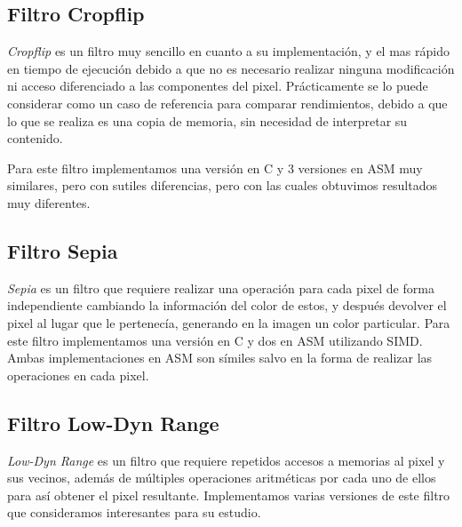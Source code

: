 \subsection{Filtro Cropflip}

\textit{Cropflip} es un filtro muy sencillo en cuanto a su implementación, y el mas rápido en tiempo de ejecución debido a que no es necesario realizar ninguna modificación ni acceso diferenciado a las componentes del pixel.
Prácticamente se lo puede considerar como un caso de referencia para comparar rendimientos, debido a que lo que se realiza es una copia de memoria, sin necesidad de interpretar su contenido.

Para este filtro implementamos una versión en C y 3 versiones en ASM muy similares, pero con sutiles diferencias, pero con las cuales obtuvimos resultados muy diferentes.




\subsection{Filtro Sepia}
\textit{Sepia} es un filtro que requiere realizar una operación para cada pixel de forma independiente cambiando la información del color de estos, y después devolver el pixel al lugar que le pertenecía, generando en la imagen un color particular.
Para este filtro implementamos una versión en C y dos en ASM utilizando SIMD. Ambas implementaciones en ASM son símiles salvo en la forma de realizar las operaciones en cada pixel.




\subsection{Filtro Low-Dyn Range}
\textit{Low-Dyn Range} es un filtro que requiere repetidos accesos a memorias al pixel y sus vecinos, además de múltiples operaciones aritméticas por cada uno de ellos para así obtener el pixel resultante. Implementamos varias versiones de este filtro que consideramos interesantes para su estudio.




